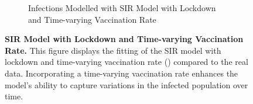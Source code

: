 \documentclass[tikz,fleqn,12pt]{wlscirep}
\begin{document}
\begin{figure}[htbp!]
\begin{subfigure}[t]{\textwidth}
    \caption{Infections Modelled with SIR Model with Lockdown and Time-varying Vaccination Rate}
    \label{fig:SIR_model_with_lockdown_with_vaccination_infections_time_varying_nu_IND}
  \end{subfigure}
  \caption{\textbf{SIR Model with Lockdown and Time-varying Vaccination Rate.} This figure displays the fitting of the SIR model with lockdown and time-varying vaccination rate () compared to the real data.  Incorporating a time-varying vaccination rate enhances the model's ability to capture variations in the infected population over time.}
  \label{fig:SIR_model_with_lockdown_with_vaccination_infections_time_varying_nu_IND_parent}
\end{figure}
\end{document}
